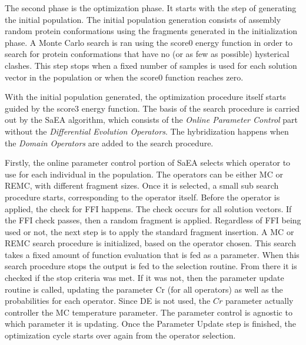 The second phase is the optimization phase.  It starts with the step of
generating the initial population. The initial population generation consists
of assembly random protein conformations using the fragments generated in the
initialization phase. A Monte Carlo search is ran using the score0 energy
function in order to search for protein conformations that have no (or as few
as possible) hysterical clashes. This step stops when a fixed number of samples
is used for each solution vector in the population or when the score0 function
reaches zero.

With the initial population generated, the optimization procedure itself starts
guided by the score3 energy function. The basis of the search procedure is
carried out by the \ac{SaEA} algorithm, which consists of the \textit{Online
Parameter Control} part without the \textit{Differential Evolution Operators}.
The hybridization happens when the \textit{Domain Operators} are added to the
search procedure.

Firstly, the online parameter control portion of \ac{SaEA} selects which
operator to use for each individual in the population.
%
The operators can be either \ac{MC} or \ac{REMC}, with different fragment sizes.
Once it is selected, a small sub search procedure starts, corresponding to the
operator itself.
%
Before the operator is applied, the check for \ac{FFI} happens. The check occurs
for all solution vectors. If the \ac{FFI} check passes, then a random fragment
is applied. Regardless of \ac{FFI} being used or not, the next step is to apply
the standard fragment insertion.
%
A \ac{MC} or \ac{REMC} search procedure is initialized,
based on the operator chosen. This search takes a fixed amount of function
evaluation that is fed as a parameter. When this search procedure stops the
output is fed to the selection routine. From there it is checked if the stop
criteria was met. If it was not, then the parameter update routine is called,
updating the parameter Cr (for all operators) as well as the
probabilities for each operator. Since \ac{DE} is not used, the $Cr$ parameter
actually controller the \ac{MC} temperature parameter. The parameter control is
agnostic to which parameter it is updating. Once the Parameter Update step is
finished, the optimization cycle starts over again from the operator selection.

